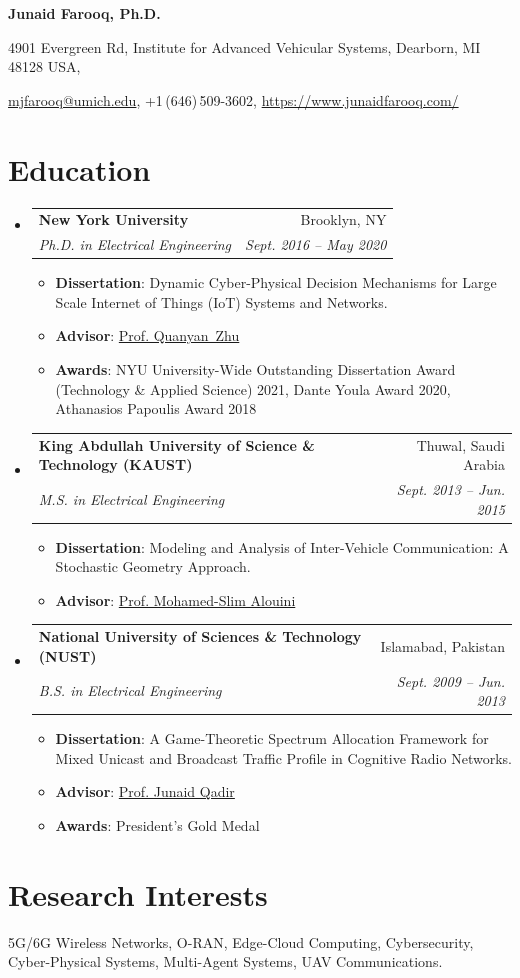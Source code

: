 \documentclass[letterpaper,11pt]{article}
\makeatletter
\newcommand{\resumeItem}[2]{
  \item\small{
    \textbf{#1}{: #2 \vspace{-2pt}}
  }
}
\newcommand{\resumeSubheading}[4]{
  \vspace{-1pt}\item
    \begin{tabular*}{0.97\textwidth}{l@{\extracolsep{\fill}}r}
      \textbf{#1} & #2 \\
      \textit{\small#3} & \textit{\small #4} \\
    \end{tabular*}\vspace{-5pt}
}
\newcommand{\resumeSubHeadingListStart}{\begin{itemize}[leftmargin=*]}
\newcommand{\resumeSubHeadingListEnd}{\end{itemize}}
\newcommand{\resumeItemListStart}{\begin{itemize}}
\newcommand{\resumeItemListEnd}{\end{itemize}\vspace{-5pt}}
\makeatother
\begin{document}
\begin{center}
  \LARGE \textbf{Junaid Farooq, Ph.D.}
\end{center}
\begin{center}
4901 Evergreen Rd, Institute for Advanced Vehicular Systems, Dearborn, MI 48128 USA,
\par
\href{mailto:mjfarooq@umich.edu}
{mjfarooq@umich.edu},
+1\,(646)\,509-3602, \url{https://www.junaidfarooq.com/}
\end{center}
\section{Education}
  \resumeSubHeadingListStart
    \resumeSubheading
      {New York University}{Brooklyn, NY}
      {Ph.D. in Electrical Engineering}{\textnormal{Sept. 2016 -- May 2020}}
    \resumeItemListStart
     \resumeItem{Dissertation}{Dynamic Cyber-Physical Decision Mechanisms for Large Scale Internet of Things (IoT) Systems and Networks.}
     \resumeItem{Advisor}{\href{https://wp.nyu.edu/quanyan/}{Prof. Quanyan~Zhu}}
     \resumeItem{Awards}{NYU University-Wide Outstanding Dissertation Award (Technology \& Applied Science) 2021, Dante Youla Award 2020, Athanasios Papoulis Award 2018}
     \resumeItemListEnd
    \resumeSubheading
      {King Abdullah University of Science \& Technology (KAUST)}{Thuwal, Saudi Arabia}
      {M.S. in Electrical Engineering}{\textnormal{Sept. 2013 -- Jun. 2015}}
      \resumeItemListStart
      \resumeItem{Dissertation}{Modeling and Analysis of Inter-Vehicle Communication: A Stochastic Geometry Approach.}
      \resumeItem{Advisor}{\href{https://www.kaust.edu.sa/en/study/faculty/mohamed-slim-alouini}{Prof. Mohamed-Slim Alouini}}
      \resumeItemListEnd
    \resumeSubheading
      {National University of Sciences \& Technology (NUST)}{Islamabad, Pakistan}
      {B.S. in Electrical Engineering}{\textnormal{Sept. 2009 -- Jun. 2013}}
      \resumeItemListStart
      \resumeItem{Dissertation}{A Game-Theoretic Spectrum Allocation Framework for Mixed Unicast and Broadcast Traffic Profile in Cognitive Radio Networks.}
      \resumeItem{Advisor}{\href{http://qufaculty.qu.edu.qa/jqadir/}{Prof. Junaid Qadir}}
      \resumeItem{Awards}{President's Gold Medal}
      \resumeItemListEnd
  \resumeSubHeadingListEnd

\section{Research Interests}
5G/6G Wireless Networks, O-RAN, Edge-Cloud Computing, Cybersecurity, Cyber-Physical Systems, Multi-Agent Systems, UAV Communications.
\end{document}
